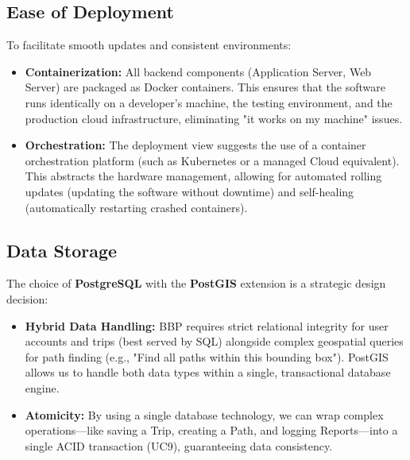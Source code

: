 \subsection{Ease of Deployment}
To facilitate smooth updates and consistent environments:
\begin{itemize}
    \item \textbf{Containerization:} All backend components (Application Server, Web Server) are packaged as Docker containers. This ensures that the software runs identically on a developer's machine, the testing environment, and the production cloud infrastructure, eliminating "it works on my machine" issues.
    \item \textbf{Orchestration:} The deployment view suggests the use of a container orchestration platform (such as Kubernetes or a managed Cloud equivalent). This abstracts the hardware management, allowing for automated rolling updates (updating the software without downtime) and self-healing (automatically restarting crashed containers).
\end{itemize}

\subsection{Data Storage}
The choice of \textbf{PostgreSQL} with the \textbf{PostGIS} extension is a strategic design decision:
\begin{itemize}
    \item \textbf{Hybrid Data Handling:} BBP requires strict relational integrity for user accounts and trips (best served by SQL) alongside complex geospatial queries for path finding (e.g., "Find all paths within this bounding box"). PostGIS allows us to handle both data types within a single, transactional database engine.
    \item \textbf{Atomicity:} By using a single database technology, we can wrap complex operations—like saving a Trip, creating a Path, and logging Reports—into a single ACID transaction (UC9), guaranteeing data consistency.
\end{itemize}